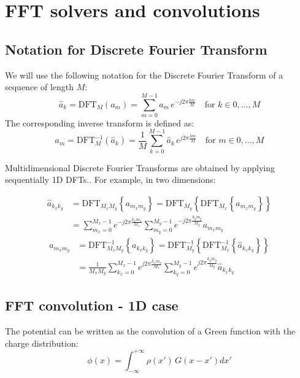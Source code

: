 \chapter{FFT solvers and convolutions}

\section{Notation for Discrete Fourier Transform}
We will use the following notation for the Discrete Fourier Transform of a sequence of length $M$:
\begin{equation}
\hat{a}_k = \text{DFT}_M(a_m) =  \sum_{m=0}^{M-1} a_m\, e^{-j2\pi  \frac{km}{M}}  \quad \text{for } k \in 0, ..., M
\end{equation}
The corresponding inverse transform is defined as:
\begin{equation}
{a}_m = \text{DFT}^{-1}_M(\hat{a}_k) =  \frac{1}{M}\sum_{k=0}^{M-1} \hat{a}_k\, e^{j2\pi  \frac{km}{M}}  \quad \text{for } m \in 0, ..., M
\end{equation}

Multidimensional Discrete Fourier Transforms are obtained by applying sequentially 1D DFTs.. For example, in two dimensions:

\begin{equation}
\begin{split}
\hat{a}_{k_xk_y} &= \text{DFT}_{M_xM_y}\left\{a_{m_xm_y}\right\}  
= \text{DFT}_{M_y} \left\{\text{DFT}_{M_x}\left\{a_{m_xm_y}\right\}\right\}\\  
&=\sum_{m_x=0}^{M_x-1} e^{-j 2\pi  \frac{k_x m_x}{M_x}} 
\sum_{m_y=0}^{M_y-1} e^{-j 2\pi  \frac{k_y m_y}{M_y}} a_{m_xm_y}
\end{split}
\end{equation}
\begin{equation}
\begin{split}
{a}_{m_xm_y} &= \text{DFT}^{-1}_{M_xM_y}\left\{a_{k_x k_y}\right\}  
= \text{DFT}^{-1}_{M_y} \left\{\text{DFT}^{-1}_{M_x}\left\{\hat{a}_{k_x k_y}\right\}\right\}\\  
&=\frac{1}{M_x M_y}\sum_{k_x=0}^{M_x-1} e^{j 2\pi  \frac{k_x m_x}{M_x}} 
\sum_{k_y=0}^{M_y-1} e^{j 2\pi  \frac{k_y m_y}{M_y}} \hat{a}_{k_xk_y}
\end{split}
\end{equation}

\section{FFT convolution - 1D case}
\label{sec:fftconv1d}
The potential can be written as the convolution of a Green function with the charge distribution:
\begin{equation}
\phi(x) = \int_{-\infty}^{+\infty} \rho(x')\,G(x-x') dx'
\label{eq:conv}
\end{equation}

